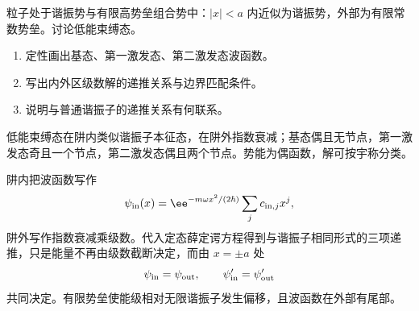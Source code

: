 \begin{question}
粒子处于谐振势与有限高势垒组合势中：$|x|<a$ 内近似为谐振势，外部为有限常数势垒。讨论低能束缚态。
\begin{enumerate}
  \item 定性画出基态、第一激发态、第二激发态波函数。
  \item 写出内外区级数解的递推关系与边界匹配条件。
  \item 说明与普通谐振子的递推关系有何联系。
\end{enumerate}
\begin{solution}
低能束缚态在阱内类似谐振子本征态，在阱外指数衰减；基态偶且无节点，第一激发态奇且一个节点，第二激发态偶且两个节点。势能为偶函数，解可按宇称分类。

阱内把波函数写作
\[
  \psi_{\rm in}(x)=\ee^{-m\omega x^2/(2\hbar)}\sum_j c_{{\rm in},j}x^j,
\]
阱外写作指数衰减乘级数。代入定态薛定谔方程得到与谐振子相同形式的三项递推，只是能量不再由级数截断决定，而由 $x=\pm a$ 处
\[
  \psi_{\rm in}=\psi_{\rm out},\qquad
  \psi_{\rm in}'=\psi_{\rm out}'
\]
共同决定。有限势垒使能级相对无限谐振子发生偏移，且波函数在外部有尾部。
\end{solution}
\end{question}

